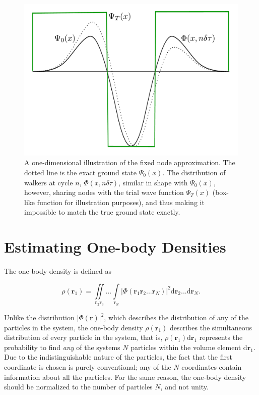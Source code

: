 \begin{figure}
 \begin{center}
  \includegraphics[scale=0.3]{../Graphics/fixxednode.pdf}
  \caption{A one-dimensional illustration of the fixed node approximation. The dotted line is the exact ground state $\Psi_0(x)$. The distribution of walkers at cycle $n$, $\Phi(x, n\delta\tau)$, similar in shape with $\Psi_0(x)$, however, sharing nodes with the trial wave function $\Psi_T(x)$ (box-like function for illustration purposes), and thus making it impossible to match the true ground state exactly.}
  \label{fig:fixxednode}
 \end{center}
\end{figure}


\section{Estimating One-body Densities}
\label{sec:OBD}

The one-body density is defined as

\begin{equation}
 \rho(  \mathbf{r}_1) = \iint\limits_{  \mathbf{r}_2   \mathbf{r}_3}...\int\limits_{  \mathbf{r}_N} \left|\Phi(  \mathbf{r}_1   \mathbf{r}_2 ...   \mathbf{r}_N)\right|^2\mathrm{d}  \mathbf{r}_2...\mathrm{d}  \mathbf{r}_N.
\end{equation}

Unlike the distribution $|\Phi(\mathbf{r})|^2$, which describes the distribution of any of the particles in the system, the one-body density $\rho(\mathbf{r}_1)$ describes the simultaneous distribution of every particle in the system, that is, $\rho(\mathbf{r}_1)\mathrm{d}\mathbf{r}_1$ represents the probability to find \textit{any} of the systems $N$ particles within the volume element $\mathrm{d}\mathbf{r}_1$. Due to the indistinguishable nature of the particles, the fact that the first coordinate is chosen is purely conventional; any of the $N$ coordinates contain information about all the particles. For the same reason, the one-body density should be normalized to the number of particles $N$, and not unity.   

